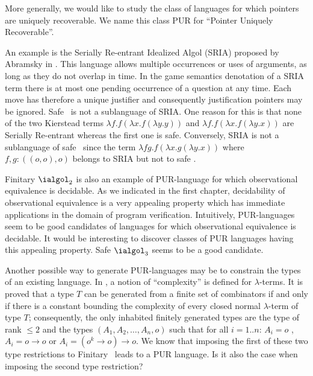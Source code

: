 More generally, we would like to study the class of languages for
which pointers are uniquely recoverable. We name this class PUR for
``Pointer Uniquely Recoverable''.

An example is the Serially Re-entrant Idealized Algol (SRIA) proposed
by Abramsky  in \cite{abramsky:mchecking_ia}. This language allows
multiple occurrences or uses of arguments, as long as they do not
overlap in time. In the game semantics denotation of a SRIA term
there is at most one pending occurrence of a question at any time.
Each move has therefore a unique justifier and consequently
justification pointers may be ignored. Safe \ialgol\ is not a
sublanguage of SRIA. One reason for this is that none of the two
Kierstead terms $\lambda f . f (\lambda x . f (\lambda y .y ))$ and
$\lambda f . f (\lambda x . f (\lambda y .x ))$ are Serially
Re-entrant whereas the first one is safe. Conversely, SRIA is not a
sublanguage of safe \ialgol\ since the term $\lambda f g. f (\lambda
x . g (\lambda y .x ))$ where $f,g:((o,o),o)$ belongs to SRIA but
not to safe \ialgol.

Finitary $\ialgol_2$ is also an example of PUR-language for which
observational equivalence is decidable. As we indicated in the first
chapter, decidability of observational equivalence is a very
appealing property which has immediate applications in the domain of
program verification. Intuitively, PUR-languages seem to be good
candidates of languages for which observational equivalence is decidable. It would be interesting to discover classes of PUR
languages having this appealing property. Safe $\ialgol_3$ seems to be a good candidate.

Another possible way to generate PUR-languages may be to constrain
the types of an existing language. In \cite{DBLP:conf/tlca/Joly01},
a notion of ``complexity'' is defined for $\lambda$-terms. It is
proved that a type $T$ can be generated from a finite set of
combinators if and only if there is a constant bounding the
complexity of every closed normal $\lambda$-term of type $T$;
consequently, the only inhabited finitely generated types are the
type of rank $\leq 2$ and the types $(A_1, A_2, \ldots, A_n, o)$
such that for all $i = 1..n$: $A_i = o$ , $A_i = o \rightarrow o$ or
$A_i = (o^k \rightarrow o) \rightarrow o$. We know that imposing the
first of these two type restrictions to Finitary \ialgol\ leads to a
PUR language. Is it also the case when imposing the second type
restriction?
